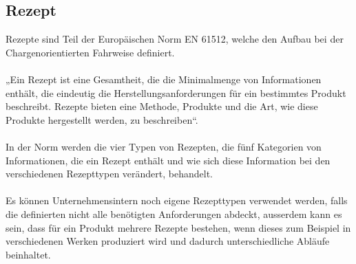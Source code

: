 \subsection{Rezept}
Rezepte sind Teil der Europäischen Norm EN 61512, welche den Aufbau bei der Chargenorientierten Fahrweise definiert.\\\\
„Ein Rezept ist eine Gesamtheit, die die Minimalmenge von Informationen enthält, die eindeutig die Herstellungsanforderungen für ein bestimmtes Produkt beschreibt. Rezepte bieten eine Methode, Produkte und die Art, wie diese Produkte hergestellt werden, zu beschreiben“.\\\\
In der Norm werden die vier Typen von Rezepten, die fünf Kategorien von Informationen, die ein Rezept enthält und wie sich diese Information bei den verschiedenen Rezepttypen verändert,  behandelt.\\\\
Es können Unternehmensintern noch eigene Rezepttypen verwendet werden, falls die definierten nicht alle benötigten Anforderungen abdeckt, ausserdem kann es sein, dass für ein Produkt mehrere Rezepte bestehen, wenn dieses zum Beispiel in verschiedenen Werken produziert wird und dadurch unterschiedliche Abläufe beinhaltet.\\

